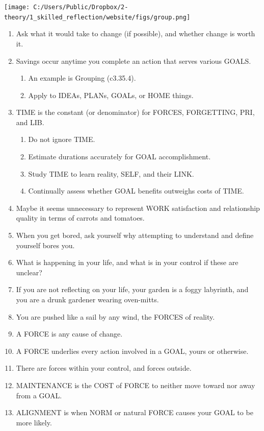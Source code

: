 \documentclass[
]{book}
\providecommand{\tightlist}{%
  \setlength{\itemsep}{0pt}\setlength{\parskip}{0pt}}
\begin{document}
\texttt{[image: C:/Users/Public/Dropbox/2-theory/1\_skilled\_reflection/website/figs/group.png]}

\begin{enumerate}
\def\labelenumi{\arabic{enumi}.}
\setcounter{enumi}{35}
\item
  Ask what it would take to change (if possible), and whether change is worth it.
\item
  Savings occur anytime you complete an action that serves various GOALS.

  \begin{enumerate}
  \def\labelenumii{\arabic{enumii}.}
  \tightlist
  \item
    An example is Grouping (c3.35.4).\\
  \item
    Apply to IDEAs, PLANs, GOALs, or HOME things.
  \end{enumerate}
\item
  TIME is the constant (or denominator) for FORCES, FORGETTING, PRI, and LIB.

  \begin{enumerate}
  \def\labelenumii{\arabic{enumii}.}
  \tightlist
  \item
    Do not ignore TIME.
  \item
    Estimate durations accurately for GOAL accomplishment.
  \item
    Study TIME to learn reality, SELF, and their LINK.
  \item
    Continually assess whether GOAL benefits outweighs costs of TIME.
  \end{enumerate}
\item
  Maybe it seems unnecessary to represent WORK satisfaction and relationship
  quality in terms of carrots and tomatoes.
\item
  When you get bored, ask yourself why attempting to understand and define yourself bores you.
\item
  What is happening in your life, and what is in your control if these are unclear?
\item
  If you are not reflecting on your life, your garden is a foggy labyrinth, and you are a drunk gardener wearing oven-mitts.
\item
  You are pushed like a sail by any wind, the FORCES of reality.
\item
  A FORCE is any cause of change.
\item
  A FORCE underlies every action involved in a GOAL, yours or otherwise.
\item
  There are forces within your control, and forces outside.
\item
  MAINTENANCE is the COST of FORCE to neither move toward nor
  away from a GOAL.
\item
  ALIGNMENT is when NORM or natural FORCE causes your GOAL to be more likely.


\end{enumerate}
\end{document}

